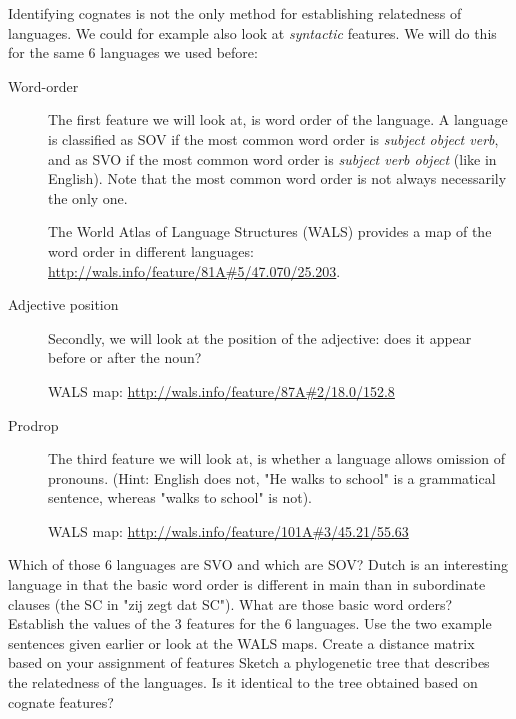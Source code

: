 \documentclass[a4paper, 9pt]{article}
\begin{document}
Identifying cognates is not the only method for establishing relatedness
of languages. We could for example also look at \emph{syntactic}
features. We will do this for the same 6 languages we used before:

\begin{description}
\item[Word-order] The first feature we will look at, is word order of the language. A language is classified as SOV if the most common word order is \textit{subject object verb}, and as SVO if the most common word order is \textit{subject verb object} (like in English).  Note that the most common word order is not always necessarily the only one.

The World Atlas of Language Structures (WALS) provides a map of the word order in different languages: \url{http://wals.info/feature/81A#5/47.070/25.203}.
\item[Adjective position] Secondly, we will look at the position of the adjective: does it appear before or after the noun?

WALS map: \url{http://wals.info/feature/87A#2/18.0/152.8}
\item[Prodrop] The third feature we will look at, is whether a language allows omission of pronouns. (Hint: English does not, "He walks to school" is a grammatical sentence, whereas "walks to school" is not).

WALS map: \url{http://wals.info/feature/101A#3/45.21/55.63}
\end{description}

\begin{exercise}
\askstar Which of those 6 languages are SVO and which are SOV?
\askstar Dutch is an interesting language in that the basic word order is different in main than in subordinate clauses (the SC in "zij zegt dat SC"). What are those basic word orders?
\action Establish the values of the 3 features for the 6 languages. Use the two example sentences given earlier or look at the WALS maps.
\askstar Create a distance matrix based on your assignment of features
\action Sketch a phylogenetic tree that describes the relatedness of the languages. Is it identical to the tree obtained based on cognate features?
\end{exercise}

\printbibliography
\end{document}
